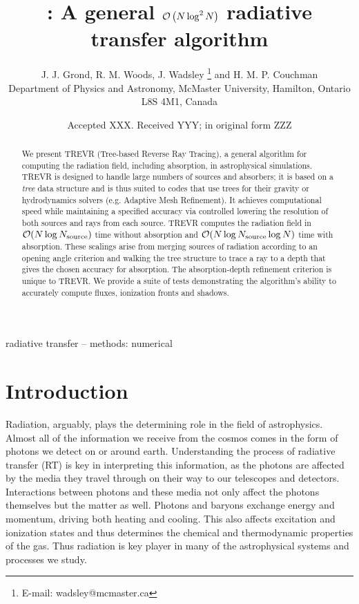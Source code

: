 \documentclass[fleq,usenatbib]{mnras}
\title[]{\acro{}: A general $\mathcal{O}\left(N\log^2N\right)$ radiative transfer algorithm}
\author[J. J. Grond et al.]{
J. J. Grond,
R. M. Woods,
J. Wadsley \thanks{E-mail:  wadsley@mcmaster.ca}
and H. M. P. Couchman
\\
Department of Physics and Astronomy, McMaster University, Hamilton, Ontario L8S
 4M1, Canada}
\date{Accepted XXX. Received YYY; in original form ZZZ}
\newcommand{\acro}{TREVR}
\newcommand{\NS}{N_{\rm source}}
\begin{document}
\label{firstpage}
\pagerange{\pageref{firstpage}--\pageref{lastpage}}
\maketitle

\begin{abstract}
We present \acro{} (Tree-based Reverse Ray Tracing), a general algorithm for 
computing the radiation field, including absorption, in astrophysical 
simulations. \acro{} is designed to handle large numbers of sources and 
absorbers; it is based on a \emph{tree} data structure and is thus suited 
to codes that use trees for their gravity or hydrodynamics solvers (e.g. 
Adaptive Mesh Refinement). It achieves computational speed while maintaining a 
specified accuracy via controlled lowering the resolution of both sources and 
rays from each source. \acro{} computes the radiation field in $\mathcal{O}(N 
\log \NS)$ time without absorption and $\mathcal{O}(N \log \NS \log{N})$ time 
with absorption.  These scalings arise from merging sources of radiation 
according to an opening angle criterion and walking the tree structure to 
trace a ray to a depth that gives the chosen accuracy for absorption. The 
absorption-depth refinement criterion is unique to \acro{}. We provide a suite 
of tests demonstrating the algorithm's ability to accurately compute fluxes, 
ionization fronts and shadows.   

\end{abstract}

\begin{keywords}
radiative transfer -- methods: numerical
\end{keywords}



\section{Introduction}\label{sec:intr}
Radiation, arguably, plays the determining role in the field of astrophysics. 
Almost all of the information we receive from the cosmos comes in the form of 
photons we detect on or around earth. Understanding the process of radiative 
transfer (RT) is key in interpreting this information, as the photons are 
affected by the media they travel through on their way to our telescopes and 
detectors. Interactions between photons and these media not only affect the 
photons themselves but the matter as well. Photons and baryons exchange energy 
and momentum, driving both heating and cooling. This also affects excitation 
and ionization states and thus determines the chemical and thermodynamic 
properties of the gas. Thus radiation is key player in many of the 
astrophysical systems and processes we study.
\end{document}
